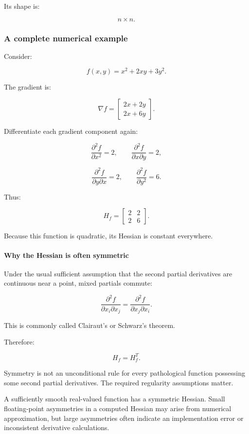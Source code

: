 Its shape is:

\[
n\times n.
\]

\subsubsection{A complete numerical example}\label{02-foundations-ii-ch021-a-complete-numerical-example}

Consider:

\[
f(x,y)=x^2+2xy+3y^2.
\]

The gradient is:

\[
\nabla f= \begin{bmatrix} 2x+2y\\ 2x+6y \end{bmatrix}.
\]

Differentiate each gradient component again:

\[
\frac{\partial^2f}{\partial x^2}=2, \qquad \frac{\partial^2f}{\partial x\partial y}=2,
\]

\[
\frac{\partial^2f}{\partial y\partial x}=2, \qquad \frac{\partial^2f}{\partial y^2}=6.
\]

Thus:

\[
\boxed{ H_f= \begin{bmatrix} 2&2\\ 2&6 \end{bmatrix} }.
\]

Because this function is quadratic, its Hessian is constant everywhere.

\paragraph{Why the Hessian is often symmetric}\label{02-foundations-ii-ch021-why-the-hessian-is-often-symmetric}

Under the usual sufficient assumption that the second partial derivatives are continuous near a point, mixed partials commute:

\[
\frac{\partial^2f}{\partial x_i\partial x_j} = \frac{\partial^2f}{\partial x_j\partial x_i}.
\]

This is commonly called Clairaut's or Schwarz's theorem.

Therefore:

\[
H_f=H_f^T.
\]

Symmetry is not an unconditional rule for every pathological function possessing some second partial derivatives. The required regularity assumptions matter.

A sufficiently smooth real-valued function has a symmetric Hessian. Small floating-point asymmetries in a computed Hessian may arise from numerical approximation, but large asymmetries often indicate an implementation error or inconsistent derivative calculations.

